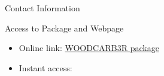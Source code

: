 \documentclass[final]{beamer}\usepackage[]{graphicx}\usepackage[]{color}
\newlength{\onecolwid}
\begin{document}
\begin{frame}[t]
\begin{columns}[t]
\begin{column}{\onecolwid}
\begin{alertblock}{Contact Information}
\end{alertblock}

\begin{block}{Access to Package and Webpage}
\begin{itemize}
\item Online link: \href{http://benjones2.github.io/WOODCARB3R/}{WOODCARB3R package}

\item Instant access: %
\end{itemize}
\vspace{0ex}
\begin{center}
\end{center}
\end{block}


\end{column} %

\end{columns} %

\end{frame} %
\end{document}
